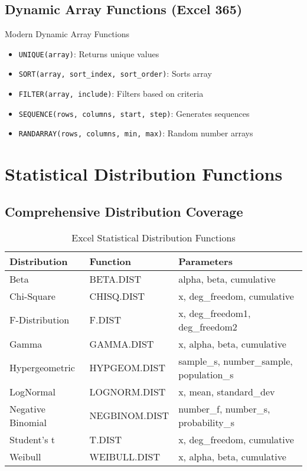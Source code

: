 \documentclass[12pt,a4paper]{book}
\begin{document}
{\subsection{Dynamic Array Functions (Excel 365)}

\begin{example}{Modern Dynamic Array Functions}
\begin{itemize}
    \item \texttt{UNIQUE(array)}: Returns unique values
    \item \texttt{SORT(array, sort\_index, sort\_order)}: Sorts array
    \item \texttt{FILTER(array, include)}: Filters based on criteria
    \item \texttt{SEQUENCE(rows, columns, start, step)}: Generates sequences
    \item \texttt{RANDARRAY(rows, columns, min, max)}: Random number arrays
\end{itemize}
\end{example}

\section{Statistical Distribution Functions}

\subsection{Comprehensive Distribution Coverage}

\begin{table}[H]
\centering
\caption{Excel Statistical Distribution Functions}
\small
\begin{tabular}{@{}lll@{}}
\toprule
\textbf{Distribution} & \textbf{Function} & \textbf{Parameters} \\
\midrule
Beta & BETA.DIST & alpha, beta, cumulative \\
Chi-Square & CHISQ.DIST & x, deg\_freedom, cumulative \\
F-Distribution & F.DIST & x, deg\_freedom1, deg\_freedom2 \\
Gamma & GAMMA.DIST & x, alpha, beta, cumulative \\
Hypergeometric & HYPGEOM.DIST & sample\_s, number\_sample, population\_s \\
LogNormal & LOGNORM.DIST & x, mean, standard\_dev \\
Negative Binomial & NEGBINOM.DIST & number\_f, number\_s, probability\_s \\
Student's t & T.DIST & x, deg\_freedom, cumulative \\
Weibull & WEIBULL.DIST & x, alpha, beta, cumulative \\
\bottomrule
\end{tabular}
\end{table}

}
\end{document}
